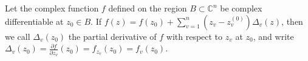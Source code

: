 Let the complex function $f$ defined on the region $B \subset \mathbb{C}^n$ be complex differentiable at $z_0 \in B$. If $f(z) = f(z_0) + \sum_{v=1}^{n} (z_v - z_v^{(0)}) \Delta_v(z)$, then we call $\Delta_v(z_0)$ the partial derivative of $f$ with respect to $z_v$ at $z_0$, and write $\Delta_v(z_0) = \frac{\partial f}{\partial z_v}(z_0) = f_{z_v}(z_0) = f_v(z_0)$.
